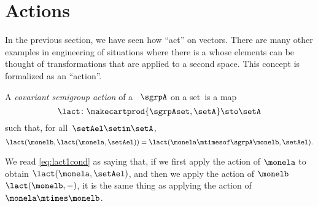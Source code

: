 
\section{Actions}
\label{sec:actions}
In the previous section, we have seen how  ``act'' on vectors.
There are many other examples in engineering of situations where there is a   whose elements can be thought of transformations that are applied to a second space.
This concept is formalized as an ``action''.

\begin{ctdefinition}
    \label{def:semigroup-cov-action-prelim}
    A \emph{covariant semigroup action} of a ~$\sgrpA$ on a set~\setA is a map
    \begin{equation}
        \label{eq:lact}
        \lact \colon \makecartprod{\sgrpAset, \setA} \sto \setA
    \end{equation}
    such that, for all~$\setAel \setin \setA$,
    \begin{equation}
        \label{eq:lact1cond}
        \lact(\monelb, \lact(\monela, \setAel)) = \lact(\monela \mtimesof\sgrpA \monelb, \setAel).
    \end{equation}
\end{ctdefinition}

We read \cref{eq:lact1cond} as saying that, if we first apply the action of $\monela$ to obtain $\lact(\monela, \setAel)$,
and then we apply the action of $\monelb$ $\lact(\monelb, -)$, it is the same thing as applying the action of $\monela\mtimes\monelb$.


